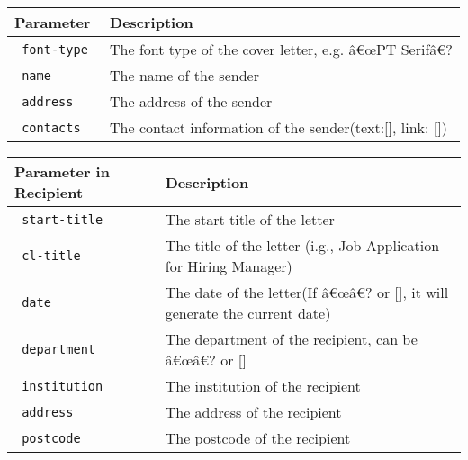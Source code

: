 \begin{Shaded}
\begin{Highlighting}[]

\NormalTok{  ),}
\NormalTok{  ),}
\NormalTok{)}

\end{Highlighting}
\end{Shaded}

\begin{longtable}[]{@{}ll@{}}
\toprule\noalign{}
Parameter & Description \\
\midrule\noalign{}
\endhead
\bottomrule\noalign{}
\endlastfoot
\texttt{\ font-type\ } & The font type of the cover letter, e.g. â€œPT
Serifâ€? \\
\texttt{\ name\ } & The name of the sender \\
\texttt{\ address\ } & The address of the sender \\
\texttt{\ contacts\ } & The contact information of the
sender(text:{[}{]}, link: {[}{]}) \\
\end{longtable}

\begin{longtable}[]{@{}ll@{}}
\toprule\noalign{}
Parameter in Recipient & Description \\
\midrule\noalign{}
\endhead
\bottomrule\noalign{}
\endlastfoot
\texttt{\ start-title\ } & The start title of the letter \\
\texttt{\ cl-title\ } & The title of the letter (i.g., Job Application
for Hiring Manager) \\
\texttt{\ date\ } & The date of the letter(If â€œâ€? or {[}{]}, it will
generate the current date) \\
\texttt{\ department\ } & The department of the recipient, can be â€œâ€?
or {[}{]} \\
\texttt{\ institution\ } & The institution of the recipient \\
\texttt{\ address\ } & The address of the recipient \\
\texttt{\ postcode\ } & The postcode of the recipient \\
\end{longtable}

